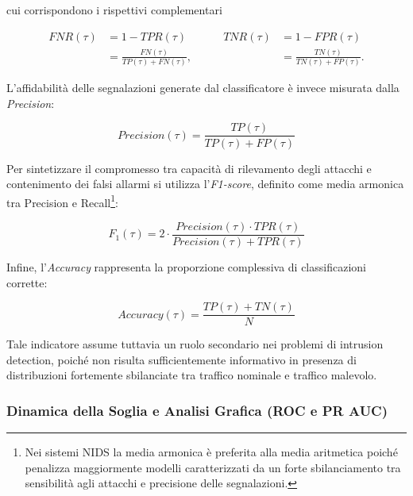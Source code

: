cui corrispondono i rispettivi complementari

\begin{equation}
\begin{aligned}
    FNR(\tau) &= 1-TPR(\tau) \\
              &= \frac{FN(\tau)}{TP(\tau)+FN(\tau)},
\end{aligned}
\qquad
\begin{aligned}
    TNR(\tau) &= 1-FPR(\tau) \\
              &= \frac{TN(\tau)}{TN(\tau)+FP(\tau)}.
\end{aligned}
\end{equation}

L'affidabilità delle segnalazioni generate dal classificatore è invece misurata dalla \textit{Precision}:

\begin{equation}
    Precision(\tau)=\frac{TP(\tau)}{TP(\tau)+FP(\tau)}
\end{equation}

Per sintetizzare il compromesso tra capacità di rilevamento degli attacchi e contenimento dei falsi allarmi si utilizza l'\textit{F1-score}, definito come media armonica tra Precision e Recall\footnote{Nei sistemi NIDS la media armonica è preferita alla media aritmetica poiché penalizza maggiormente modelli caratterizzati da un forte sbilanciamento tra sensibilità agli attacchi e precisione delle segnalazioni.}:

\begin{equation}
    F_1(\tau)=2\cdot\frac{Precision(\tau)\cdot TPR(\tau)}{Precision(\tau)+TPR(\tau)}
\end{equation}

Infine, l'\textit{Accuracy} rappresenta la proporzione complessiva di classificazioni corrette:

\begin{equation}
    Accuracy(\tau)=\frac{TP(\tau)+TN(\tau)}{N}
\end{equation}

Tale indicatore assume tuttavia un ruolo secondario nei problemi di intrusion detection, poiché non risulta sufficientemente informativo in presenza di distribuzioni fortemente sbilanciate tra traffico nominale e traffico malevolo.

\subsubsection{Dinamica della Soglia e Analisi Grafica (ROC e PR AUC)}
\label{subsubsec:analisi_grafica}

